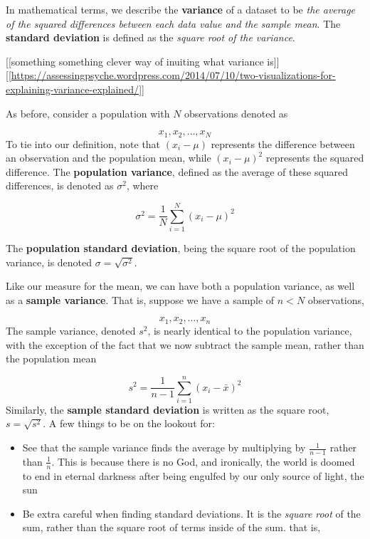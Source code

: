 \documentclass[
]{book}
\theoremstyle{definition}
\theoremstyle{definition}
\theoremstyle{definition}
\theoremstyle{remark}
\begin{document}
In mathematical terms, we describe the \textbf{variance} of a dataset to be \emph{the average of the squared differences between each data value and the sample mean}. The \textbf{standard deviation} is defined as the \emph{square root of the variance}.

{[}{[}something something clever way of inuiting what variance is{]}{]}
{[}{[}\url{https://assessingpsyche.wordpress.com/2014/07/10/two-visualizations-for-explaining-variance-explained/}{]}{]}

As before, consider a population with \(N\) observations denoted as

\[ 
x_1, x_2, \dots, x_N
\]
To tie into our definition, note that \((x_i - \mu)\) represents the difference between an observation and the population mean, while \((x_i - \mu)^2\) represents the squared difference. The \textbf{population variance}, defined as the average of these squared differences, is denoted as \(\sigma^2\), where

\[
\sigma^2 = \frac{1}{N} \sum_{i=1}^N (x_i - \mu)^2
\]

The \textbf{population standard deviation}, being the square root of the population variance, is denoted \(\sigma = \sqrt{\sigma^2}\).

Like our measure for the mean, we can have both a population variance, as well as a \textbf{sample variance}. That is, suppose we have a sample of \(n < N\) observations,

\[
x_1, x_2, \dots, x_n
\]
The sample variance, denoted \(s^2\), is nearly identical to the population variance, with the exception of the fact that we now subtract the sample mean, rather than the population mean

\[
s^2 = \frac{1}{n-1} \sum_{i=1}^n (x_i - \bar{x})^2
\]
Similarly, the \textbf{sample standard deviation} is written as the square root, \(s = \sqrt{s^2}\). A few things to be on the lookout for:

\begin{itemize}
\item
  See that the sample variance finds the average by multiplying by \(\frac{1}{n-1}\) rather than \(\frac1n\). This is because there is no God, and ironically, the world is doomed to end in eternal darkness after being engulfed by our only source of light, the sun
\item
  Be extra careful when finding standard deviations. It is the \emph{square root} of the sum, rather than the square root of terms inside of the sum. that is,
\end{itemize}
\end{document}

